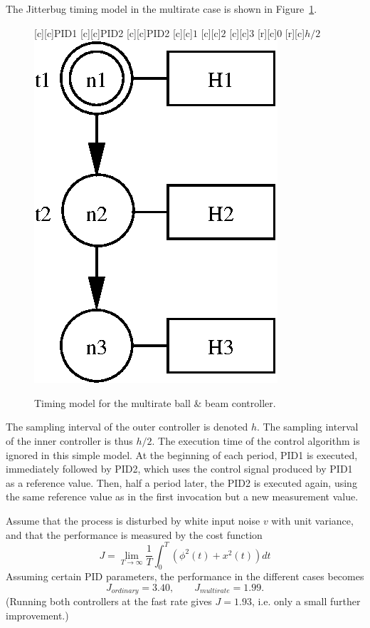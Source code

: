 \documentclass[final,twoside]{rapport}  %
\begin{document}
The {\sc Jitterbug} timing model in the multirate case is shown in
Figure~\ref{fig:multiratetiming}.
\begin{figure}[bp]
  \centerline{
  [c][c]{PID1}
  [c][c]{PID2}
  [c][c]{PID2}
  [c][c]{$1$}
  [c][c]{$2$}
  [c][c]{$3$}
  [r][c]{$0$}
  [r][c]{$h/2$}
  \includegraphics[scale=0.63]{multiratetiming.eps}
  }
  \caption{Timing model for the multirate ball \& beam controller.}
  \label{fig:multiratetiming}
\end{figure}
The sampling interval of the outer controller is denoted $h$. The
sampling interval of the inner controller is thus $h/2$. The execution
time of the control algorithm is ignored in this simple model. At the
beginning of each period, PID1 is executed, immediately followed by
PID2, which uses the control signal produced by PID1 as a reference
value. Then, half a period later, the PID2 is executed again, using
the same reference value as in the first invocation but a new
measurement value.

Assume that the process is disturbed by white input noise $v$ with
unit variance, and that the performance is measured by the cost
function
\[
J = \lim_{T \rightarrow \infty} \frac{1}{T} \int_0^T \! \left(
  \phi^2(t) + x^2(t) \right) dt
\]
Assuming certain PID parameters, the performance in the different
cases becomes
\[
J_\mathit{ordinary} = 3.40, \qquad J_\mathit{multirate} = 1.99.
\]
(Running both controllers at the fast rate gives $J=1.93$, i.e. only a
small further improvement.)
\end{document}

